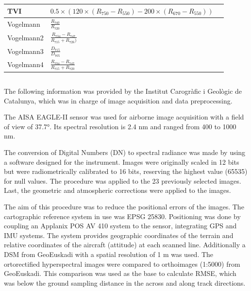 \documentclass[remotesensing,article,submit,moreauthors,pdftex]{Definitions/mdpi}
\begin{document}
{\begin{supertabular}{lll}
		\midrule
		TVI             & \parbox{3.8cm}{$0.5\times (120 \times (R_{750}-R_{550})-200 \times (R_{670}-R_{550}))$}              & \cite{broge2001}              \\
		\midrule
		Vogelmann       & $\frac{R_{740}}{R_{720}}$                                                                            & \cite{vogelmann1993}          \\
		Vogelmann2      & $\frac{R_{734}-R_{747}}{R_{715}+R_{726})}$                                                           & \cite{vogelmann1993}          \\
		Vogelmann3      & $\frac{D_{715}}{D_{705}}$                                                                            & \cite{vogelmann1993}          \\
		Vogelmann4      & $\frac{R_{734}-R_{747}}{R_{715}+R_{720}}$                                                            & \cite{vogelmann1993}     \\
	\end{supertabular}
	\label{tab:vegindices}
}

\pagebreak

\subsection{}

The following information was provided by the Institut Carogràfic i Geològic de Catalunya, which was in charge of image acquisition and data preprocessing.

The AISA EAGLE-II sensor was used for airborne image acquisition with a field of view of 37.7°.
Its spectral resolution is 2.4 nm and ranged from 400 to 1000 nm.

The conversion of Digital Numbers (DN) to spectral radiance was made by using a software designed for the instrument.
Images were originally scaled in 12 bits but were radiometrically calibrated to 16 bits, reserving the highest value (65535) for null values.
The procedure was applied to the 23 previously selected images.
Last, the geometric and atmospheric corrections were applied to the images.

The aim of this procedure was to reduce the positional errors of the images.
The cartographic reference system in use was EPSG 25830.
Positioning was done by coupling an Applanix POS AV 410 system to the sensor, integrating GPS and IMU systems.
The system provides geographic coordinates of the terrain and relative coordinates of the aircraft (attitude) at each scanned line.
Additionally a DSM from GeoEuskadi with a spatial resolution of 1 m was used.
The ortorectified hyperspectral images were compared to orthoimages (1:5000) from GeoEuskadi.
This comparison was used as the base to calculate RMSE, which was below the ground sampling distance in the across and along track directions.
\end{document}
